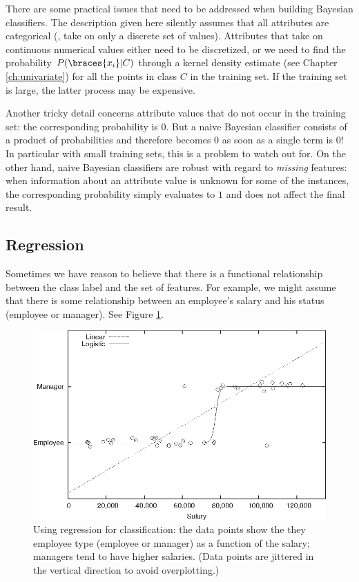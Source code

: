 There are some practical issues that need to be addressed when
building Bayesian classifiers. The description given here silently
assumes that all attributes are categorical (\ie, take on only a
discrete set of values). Attributes that take on continuous numerical
values either need to be discretized, or we need to find the
probability $P( \braces{x_i} | C )$ through a kernel density estimate
(see Chapter \ref{ch:univariate}) for all the points in class $C$ in
the training set. If the training set is large, the latter process may
be\vadjust{\vspace*{36pt}\pagebreak} expensive.

Another tricky detail concerns attribute values that do not occur in
the training set: the corresponding probability is $0$. But a naive
Bayesian classifier consists of a product of probabilities and
therefore becomes $0$ as soon as a single term is $0$! In particular
with small training sets, this is a problem to watch out for. On the
other hand, naive Bayesian classifiers are robust with regard to
\emph{missing} features: when information about an attribute value is
unknown for some of the instances, the corresponding probability
simply evaluates to $1$ and does not affect the final result.


\subsection{Regression}


Sometimes we have reason to believe that there is a functional
relationship between the class label and the set of features.  For
example, we might assume that there is some relationship between an
employee's salary and his status (employee or manager). See Figure
\ref{fig:predictregression}.

\begin{figure}
\centerline{\includegraphics{img/predictregr}}
  \caption{Using regression for classification: the data points show
    the they employee type (employee or manager) as a function of the
    salary; managers tend to have higher salaries. (Data points are
    jittered in the vertical direction to avoid overplotting.)}
  \label{fig:predictregression}
\end{figure}

